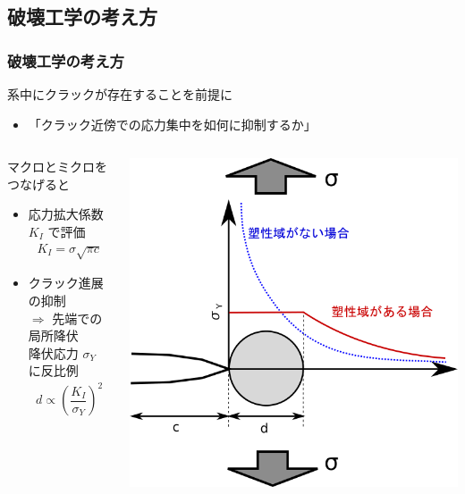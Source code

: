 \documentclass[11pt, dvipdfmx]{beamer}
\begin{document}
\subsection{破壊工学の考え方}
\begin{frame}
\frametitle{破壊工学の考え方}
\begin{exampleblock}{系中にクラックが存在することを前提に}

\begin{itemize}
\item
\alert{「クラック近傍での応力集中を如何に抑制するか」}
\end{itemize}
\end{exampleblock}

\begin{columns}[totalwidth=1\textwidth]
\begin{alertblock}{マクロとミクロをつなげると}
	\begin{itemize}
		\item
		\alert{応力拡大係数 $K_I$ で評価}
		\small
		\begin{align*}
		K_{I} = \sigma \sqrt{\pi c}
		\end{align*}
		\normalsize
		\item 
		クラック進展の抑制 \\
		$\Rightarrow$ 先端での\alert{局所降伏}\\
		降伏応力 $\sigma_Y$ に反比例
		\small
		\begin{align*}
		d \propto \left( \dfrac{K_I}{\sigma_Y} \right)^2
		\end{align*}
		\normalsize
	\end{itemize}
\end{alertblock}
	\centering
	\includegraphics[width=.9\textwidth]{yeild_crack.png}
\end{columns}
\end{frame}
\end{document}
